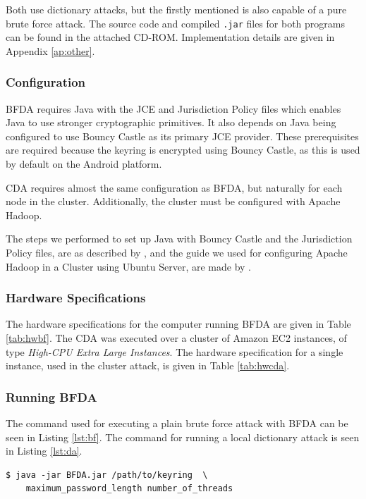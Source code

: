 \documentclass[pdftex,english,10pt,b5paper,twoside]{book}
\begin{document}
Both use dictionary attacks, but the firstly mentioned is also capable of a
pure brute force attack. The source code and compiled \texttt{.jar} files for
both programs can be found in the attached CD-ROM. Implementation details are
given in Appendix \ref{ap:other}.

\subsubsection{Configuration}

\ac{BFDA} requires Java with the \ac{JCE} and Jurisdiction Policy files which
enables Java to use stronger cryptographic primitives. It also depends on Java
being configured to use Bouncy Castle as its primary \ac{JCE} provider. These
prerequisites are required because the keyring is encrypted using Bouncy
Castle, as this is used by default on the Android platform.

\ac{CDA} requires almost the same configuration as \ac{BFDA}, but naturally for
each node in the cluster. Additionally, the cluster must be configured with
Apache Hadoop.

The steps we performed to set up Java with Bouncy Castle and the Jurisdiction
Policy files, are as described by \citet{jce+bc}, and the guide we used for
configuring Apache Hadoop in a Cluster using Ubuntu Server, are made by
\citet{cluster}.

\subsubsection{Hardware Specifications}

The hardware specifications for the computer running \acl{BFDA} are given in
Table \ref{tab:hwbf}. The \acl{CDA} was executed over a cluster of Amazon
\ac{EC2} instances, of type \emph{High-CPU Extra Large Instances}. The hardware
specification for a single instance, used in the cluster attack, is given in
Table \ref{tab:hwcda}.



\subsubsection{Running \ac{BFDA}}

The command used for executing a plain brute force attack with \ac{BFDA} can be
seen in Listing \ref{lst:bf}. The command for running a local dictionary attack
is seen in Listing \ref{lst:da}.

\lstset{label=lst:bf, caption=Running local brute force attack}
\begin{lstlisting}
$ java -jar BFDA.jar /path/to/keyring  \
    maximum_password_length number_of_threads
\end{lstlisting}
\end{document}
